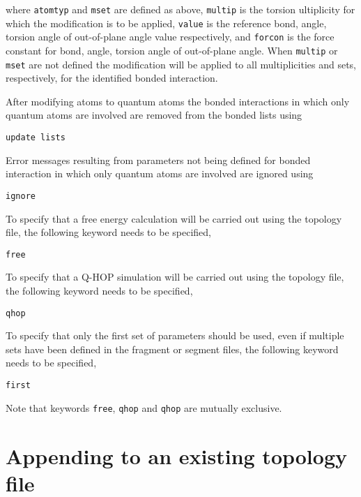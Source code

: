 where \verb+atomtyp+ and \verb+mset+ are defined as above, \verb+multip+
is the torsion ultiplicity for which the modification is to be applied,
\verb+value+ is the reference bond, angle, torsion angle of out-of-plane
angle value respectively, and \verb+forcon+ is the force constant for
bond, angle, torsion angle of out-of-plane angle. When \verb+multip+
or \verb+mset+ are not defined the modification will be applied to
all multiplicities and sets, respectively, for the identified bonded
interaction.

After modifying atoms to quantum atoms the bonded interactions in which
only quantum atoms are involved are removed from the bonded lists using

\begin{verbatim}
update lists
\end{verbatim}

Error messages resulting from parameters not being defined for bonded
interaction in which only quantum atoms are involved are ignored using

\begin{verbatim}
ignore
\end{verbatim}

To specify that a free energy calculation will be carried out using the
topology file, the following keyword needs to be specified,

\begin{verbatim}
free
\end{verbatim}

To specify that a Q-HOP simulation will be carried out using the topology
file, the following keyword needs to be specified,

\begin{verbatim}
qhop
\end{verbatim}

To specify that only the first set of parameters should be used, even if multiple
sets have been defined in the fragment or segment files, the following keyword needs
to be specified,

\begin{verbatim}
first
\end{verbatim}

Note that keywords \verb+free+, \verb+qhop+ and \verb+qhop+ are mutually exclusive.
\section{Appending to an existing topology file}

